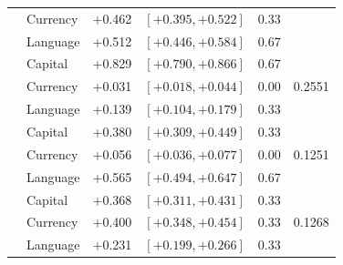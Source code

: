 \documentclass[11pt]{article}
\begin{document}
\begin{table}[H]
\begin{tabular}{llrlrr}
 & Currency & +0.462 & \([+0.395,+0.522]\) & 0.33 & \\
 & Language & +0.512 & \([+0.446,+0.584]\) & 0.67 & \\
\addlinespace
\multirow{3}{*}{\(2-0-1\)} & Capital & +0.829 & \([+0.790,+0.866]\) & 0.67 & \multirow{3}{*}{0.2551} \\
 & Currency & +0.031 & \([+0.018,+0.044]\) & 0.00 & \\
 & Language & +0.139 & \([+0.104,+0.179]\) & 0.33 & \\
\addlinespace
\multirow{3}{*}{\(1-0-2\)} & Capital & +0.380 & \([+0.309,+0.449]\) & 0.33 & \multirow{3}{*}{0.1251} \\
 & Currency & +0.056 & \([+0.036,+0.077]\) & 0.00 & \\
 & Language & +0.565 & \([+0.494,+0.647]\) & 0.67 & \\
\addlinespace
\multirow{3}{*}{\(1-1-1\)} & Capital & +0.368 & \([+0.311,+0.431]\) & 0.33 & \multirow{3}{*}{0.1268} \\
 & Currency & +0.400 & \([+0.348,+0.454]\) & 0.33 & \\
 & Language & +0.231 & \([+0.199,+0.266]\) & 0.33 & \\
\bottomrule
\end{tabular}
\end{table}
\end{document}
